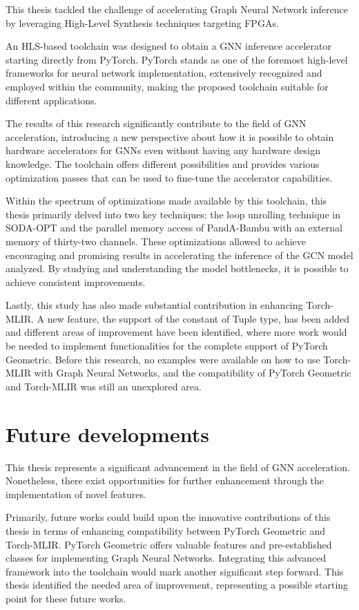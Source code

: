 This thesis tackled the challenge of accelerating Graph Neural Network inference by leveraging High-Level Synthesis techniques targeting FPGAs.

An HLS-based toolchain was designed to obtain a GNN inference accelerator starting directly from PyTorch.
PyTorch stands as one of the foremost high-level frameworks for neural network implementation, extensively recognized and employed within the community, making the proposed toolchain suitable for different applications.

The results of this research significantly contribute to the field of GNN acceleration, introducing a new perspective about how it is possible to obtain hardware accelerators for GNNs even without having any hardware design knowledge.
The toolchain offers different possibilities and provides various optimization passes that can be used to fine-tune the accelerator capabilities.

Within the spectrum of optimizations made available by this toolchain, this thesis primarily delved into two key techniques: the loop unrolling technique in SODA-OPT and the parallel memory access of PandA-Bambu with an external memory of thirty-two channels.
These optimizations allowed to achieve encouraging and promising results in accelerating the inference of the GCN model analyzed.
By studying and understanding the model bottlenecks, it is possible to achieve consistent improvements.

Lastly, this study has also made substantial contribution in enhancing Torch-MLIR\@.
A new feature, the support of the constant of Tuple type, has been added and different areas of improvement have been identified, where more work would be needed to implement functionalities for the complete support of PyTorch Geometric.
Before this research, no examples were available on how to use Torch-MLIR with Graph Neural Networks, and the compatibility of PyTorch Geometric and Torch-MLIR was still an unexplored area.

\section{Future developments}
\label{sec:future-dev}%


This thesis represents a significant advancement in the field of GNN acceleration.
Nonetheless, there exist opportunities for further enhancement through the implementation of novel features.

Primarily, future works could build upon the innovative contributions of this thesis in terms of enhancing compatibility between PyTorch Geometric and Torch-MLIR\@.
PyTorch Geometric offers valuable features and pre-established classes for implementing Graph Neural Networks.
Integrating this advanced framework into the toolchain would mark another significant step forward.
This thesis identified the needed area of improvement, representing a possible starting point for these future works.

